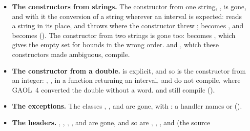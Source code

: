 \begin{itemize}
  its negation, so that
  \code{==} of $[3, 4]$ and $[3, 4]$ was false, and \code{!=} true. They are
  now  and , the equality of sets:
  \code{[3, 4] == [3, 4]} is true, \code{[4] == [3, 4]} false. A program that
  used them still compiles, and gives other results: it chooses the relation
  it means.
\item[$\bullet$] \textbf{The constructors from strings.} The constructor from
  one string, , is gone, and with it the
  conversion of a string wherever an interval is expected:
   reads a string in its place, and throws
   where the constructor threw
  ;  becomes , and
   becomes 
  (). The constructor from two strings is gone too:
   becomes ,
  which gives the empty set for bounds in the wrong order. 
  and , which these constructors made ambiguous, compile.
\item[$\bullet$] \textbf{The constructor from a double.}
   is explicit, and so is the constructor from an
  integer: , ,
   in a function returning an interval, 
  and  do not compile, where GAOL~4 converted the
  double without a word.  and 
  still compile ().
\item[$\bullet$] \textbf{The exceptions.} The classes ,
  ,  and
   are gone, with
  : a handler names
   or 
  ().
\item[$\bullet$] \textbf{The headers.} ,
  , ,
  ,  and
   are gone, and so are
  ,
  ,
  ,
   and
   (the source

\end{itemize}
